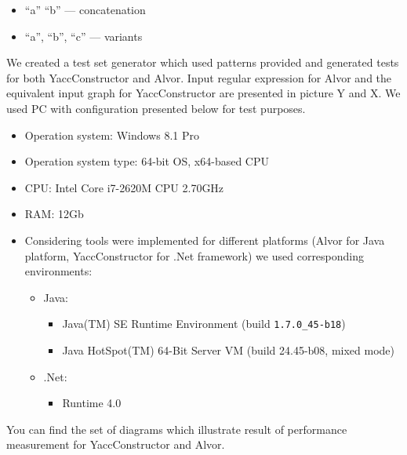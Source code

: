 \documentclass{sigplanconf}
\begin{document}
\begin{itemize}
\item “a” “b” — concatenation
\item  {“a”, “b”, “c”} — variants
\end{itemize}

	We created a test set generator which used patterns provided and generated tests for both YaccConstructor and Alvor. Input regular expression for Alvor and the equivalent input graph for YaccConstructor are presented in picture Y and X.
We used PC with configuration presented below for test purposes.

\begin{itemize}
    \item Operation system: Windows 8.1 Pro
    \item Operation system type: 64-bit OS, x64-based CPU
    \item CPU: Intel Core i7-2620M CPU 2.70GHz
    \item RAM: 12Gb
    \item Considering tools were implemented for different platforms (Alvor for Java platform, YaccConstructor for .Net framework) we used corresponding environments:
        \begin{itemize}
        \item Java: 
            \begin{itemize}
                \item Java(TM) SE Runtime Environment (build \verb|1.7.0_45-b18|)
                \item Java HotSpot(TM) 64-Bit Server VM (build 24.45-b08, mixed mode)
            \end{itemize}
        \item .Net:
            \begin{itemize}
                \item Runtime  4.0
            \end{itemize}
        \end{itemize}
\end{itemize}

You can find the set of diagrams which illustrate result of performance measurement for YaccConstructor and Alvor.
\end{document}
